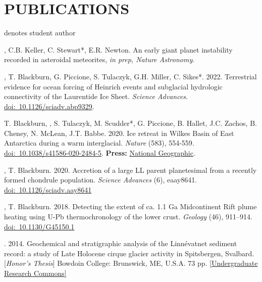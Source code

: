 \section*{PUBLICATIONS}
\hfill* denotes student author
\begin{etaremune} [itemsep=4pt, leftmargin=3ex]
\item[] \ghedwards, C.B. Keller, C. Stewart*, E.R. Newton. An early giant planet instability recorded in asteroidal meteorites, \textit{in prep, Nature Astronomy}.
\item \ghedwards, T. Blackburn, G. Piccione, S. Tulaczyk, G.H. Miller, C. Sikes*. 2022. Terrestrial evidence for ocean forcing of Heinrich events and subglacial hydrologic connectivity of the Laurentide Ice Sheet. \textit{Science Advances}. \href{https://www.science.org/doi/10.1126/sciadv.abp9329}{doi:~10.1126/sciadv.abp9329}.
\item T. Blackburn, \ghedwards, S. Tulaczyk, M. Scudder*, G. Piccione, B. Hallet, J.C. Zachos, B. Cheney, N. McLean, J.T. Babbe. 2020. Ice retreat in Wilkes Basin of East Antarctica during a warm interglacial. \textit{Nature} (583), 554-559. \href{https://doi.org/10.1038/s41586-020-2484-5}{doi:~10.1038/s41586-020-2484-5}. \textbf{Press:} \href{https://www.nationalgeographic.com/science/2020/07/east-antarctic-ice-sheet-more-vulnerable-to-melting-than-thought/}{National Geographic}.
\item \ghedwards, T. Blackburn. 2020. Accretion of a large LL parent planetesimal from a recently formed chondrule population. \textit{Science Advances} (6), eaay8641. \href{https://advances.sciencemag.org/content/6/16/eaay8641}{doi:~10.1126/sciadv.aay8641}
\item \ghedwards, T. Blackburn. 2018. Detecting the extent of ca. 1.1 Ga Midcontinent Rift plume heating using U-Pb thermochronology of the lower crust. \textit{Geology} (46), 911–914. \href{https://doi.org/10.1130/G45150.1}{doi:~10.1130/G45150.1} 
\item \ghedwards. 2014. Geochemical and stratigraphic analysis of the Linnévatnet sediment record: a study of Late Holocene cirque glacier activity in Spitsbergen, Svalbard. [\textit{Honor’s Thesis}] Bowdoin College: Brunswick, ME, U.S.A. 73 pp. \href{https://digitalcommons.bowdoin.edu/honorsprojects/12/}{[Undergraduate Research Commons]}
\end{etaremune}